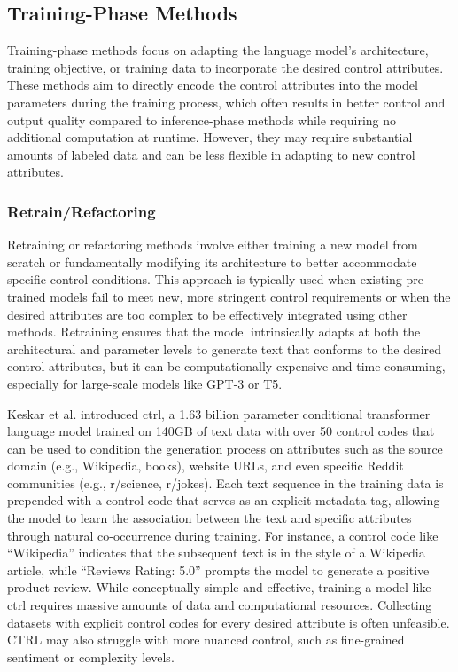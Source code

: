 \subsection{Training-Phase Methods}
Training-phase methods focus on adapting the language model's architecture, training objective, or training data to incorporate the desired control attributes. 
These methods aim to directly encode the control attributes into the model parameters during the training process, which often results in better control and output quality compared to inference-phase methods while requiring no additional computation at runtime.
However, they may require substantial amounts of labeled data and can be less flexible in adapting to new control attributes.

\subsubsection{Retrain/Refactoring}
Retraining or refactoring methods involve either training a new model from scratch or fundamentally modifying its architecture to better accommodate specific control conditions. 
This approach is typically used when existing pre-trained models fail to meet new, more stringent control requirements or when the desired attributes are too complex to be effectively integrated using other methods.
Retraining ensures that the model intrinsically adapts at both the architectural and parameter levels to generate text that conforms to the desired control attributes, but it can be computationally expensive and time-consuming, especially for large-scale models like GPT-3 or T5.

Keskar et al. \cite{keskar2019ctrlconditionaltransformerlanguage} introduced \gls{ctrl}, a 1.63 billion parameter conditional transformer language model trained on 140GB of text data with over 50 control codes that can be used to condition the generation process on attributes such as the source domain (e.g., Wikipedia, books), website URLs, and even specific Reddit communities (e.g., r/science, r/jokes).
Each text sequence in the training data is prepended with a control code that serves as an explicit metadata tag, allowing the model to learn the association between the text and specific attributes through natural co-occurrence during training.
For instance, a control code like ``Wikipedia'' indicates that the subsequent text is in the style of a Wikipedia article, while ``Reviews Rating: 5.0'' prompts the model to generate a positive product review.
While conceptually simple and effective, training a model like \gls{ctrl} requires massive amounts of data and computational resources. 
Collecting datasets with explicit control codes for every desired attribute is often unfeasible.
CTRL may also struggle with more nuanced control, such as fine-grained sentiment or complexity levels.

